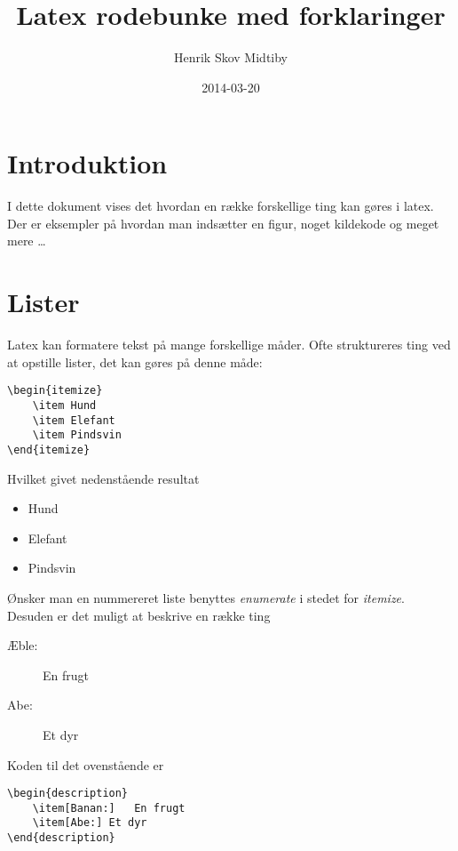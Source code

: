 \documentclass[11pt,a4paper,fleqn]{article}
\author{Henrik Skov Midtiby}
\title{Latex rodebunke med forklaringer}
\date{2014-03-20}
\numberwithin{equation}{section}
\begin{document}
\maketitle
\newpage
\tableofcontents
\listoftodos
\newpage


\section{Introduktion}

I dette dokument vises det hvordan en række forskellige ting kan
gøres i latex. 
Der er eksempler på hvordan man indsætter en figur, noget kildekode
og meget mere \ldots

\section{Lister}

Latex kan formatere tekst på mange forskellige måder. 
Ofte struktureres ting ved at opstille lister, det kan gøres på denne måde:
%
\begin{lstlisting}
\begin{itemize}
	\item Hund
	\item Elefant
	\item Pindsvin
\end{itemize}
\end{lstlisting}
%
Hvilket givet nedenstående resultat
%
\begin{itemize}
	\item Hund
	\item Elefant
	\item Pindsvin
\end{itemize}
%
Ønsker man en nummereret liste benyttes \emph{enumerate} 
i stedet for \emph{itemize}.
Desuden er det muligt at beskrive en række ting
%
\begin{description}
	\item[Æble:] 	En frugt
	\item[Abe:]	Et dyr
\end{description}
%
Koden til det ovenstående er
%
\begin{lstlisting}
\begin{description}
	\item[Banan:] 	En frugt
	\item[Abe:]	Et dyr
\end{description}
\end{lstlisting}
\end{document}
